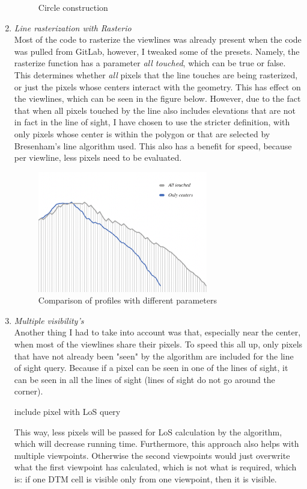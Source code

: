 \documentclass[a4paper]{article}
\begin{document}
\begin{enumerate}
\begin{figure}[H]
\caption{Circle construction}
\label{fig:circle}
\end{figure}
\newpage
    \item\emph{{Line rasterization with Rasterio}}\\
    Most of the code to rasterize the viewlines was already present when the code was pulled from GitLab, however, I tweaked some of the presets. Namely, the rasterize function has a parameter \textit{all touched}, which can be true or false. This determines whether \textit{all} pixels that the line touches are being rasterized, or just the pixels whose centers interact with the geometry. This has effect on the viewlines, which can be seen in the figure below. However, due to the fact that when all pixels touched by the line also includes elevations that are not in fact in the line of sight, I have chosen to use the stricter definition, with only pixels whose center is within the polygon or that are selected by Bresenham’s line algorithm used. This also has a benefit for speed, because per viewline, less pixels need to be evaluated.  
\begin{figure}[H]    
\centering
\includegraphics[width = 0.7\textwidth]{images/pixelscomp.png}
\caption{Comparison of profiles with different parameters}
\label{fig:profilecomp}
\end{figure}
    \item\emph{{Multiple visibility's}}\\
    Another thing I had to take into account was that, especially near the center, when most of the viewlines share their pixels. To speed this all up, only pixels that have not already been "seen" by the algorithm are included for the line of sight query. Because if a pixel can be seen in one of the lines of sight, it can be seen in all the lines of sight (lines of sight do not go around the corner).
\begin{algorithm}[H]
	\begin{algorithmic}[1]
	\State include pixel with LoS query
	\EndIf
	\end{algorithmic} 
\end{algorithm}  
    This way, less pixels will be passed for LoS calculation by the algorithm, which will decrease running time. Furthermore, this approach also helps with multiple viewpoints. Otherwise the second viewpoints would just overwrite what the first viewpoint has calculated, which is not what is required, which is: if one DTM cell is visible only from one viewpoint, then it is visible.
\end{enumerate}
\newpage
\end{document}
